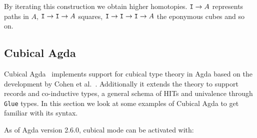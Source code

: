By iterating this construction we obtain higher homotopies. $\texttt{I} \rightarrow A$
represents paths in $A$, $\texttt{I} \rightarrow \texttt{I} \rightarrow A$ squares, $\texttt{I} \rightarrow \texttt{I} \rightarrow \texttt{I} \rightarrow A$ the
eponymous cubes and so on.

\subsection{Cubical Agda}
Cubical Agda~\cite{vezzosi2021cubical} implements support for cubical type
theory in Agda based on the development by Cohen et al.~\cite{cohen2016cubical}.
Additionally it extends the theory to support records and co-inductive types, a
general schema of HITs and univalence through \texttt{Glue} types. In this
section we look at some examples of Cubical Agda to get familiar with its
syntax.

As of Agda version 2.6.0, cubical mode can be activated with:
\begin{code}%
\>[0]\AgdaSymbol{\{-\#}\AgdaSpace{}%
\AgdaSpace{}%
\AgdaSpace{}%
\AgdaSymbol{\#-\}}\<%
\end{code}

